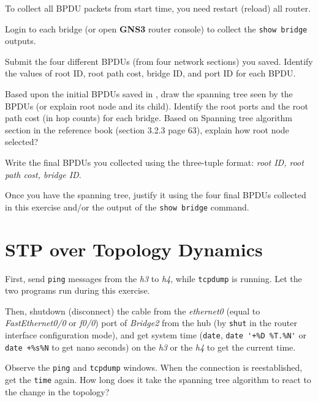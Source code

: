 \documentclass{../UTNetLab}
\begin{document}
    To collect all BPDU packets from start time, you need restart (reload) all router.

    Login to each bridge (or open \textbf{GNS3} router console) to collect the \lstinline[language={cisco}]{show bridge} outputs.
    
    \begin{report}
        \item Submit the four different BPDUs (from four network sections) you saved.
            Identify the values of root ID, root path cost, bridge ID, and port ID for each BPDU.

        \item Based upon the initial BPDUs saved in , draw the spanning tree seen by the BPDUs (or explain root node and its child).
            Identify the root ports and the root path cost (in hop counts) for each bridge.
            Based on Spanning tree algorithm section in the reference book (section 3.2.3 page 63), explain how root node selected?

        \item Write the final BPDUs you collected using the three-tuple format: \textit{{root ID, root path cost, bridge ID}}.

        \item Once you have the spanning tree, justify it using the four final BPDUs collected in this exercise and/or the output of the \lstinline[language={cisco}]{show bridge} command.
    \end{report}


\section{STP over Topology Dynamics}
    First, send \lstinline{ping} messages from the \textit{h3} to \textit{h4}, while \lstinline{tcpdump} is running.
    Let the two programs run during this exercise.

    Then, shutdown (disconnect) the cable from the \textit{ethernet0} (equal to \textit{FastEthernet0/0} or \textit{f0/0}) port of \textit{Bridge2} from the hub (by \lstinline[language=cisco]{shut} in the router interface configuration mode), and get system time (\lstinline{date}, \lstinline{date '+%D %T.%N'} or \lstinline{date +%s%N} to get nano seconds) on the \textit{h3} or the \textit{h4} to get the current time.

    Observe the \lstinline{ping} and \lstinline{tcpdump} windows.
    When the connection is reestablished, get the \lstinline{time} again.
    How long does it take the spanning tree algorithm to react to the change in the topology?
\end{document}
